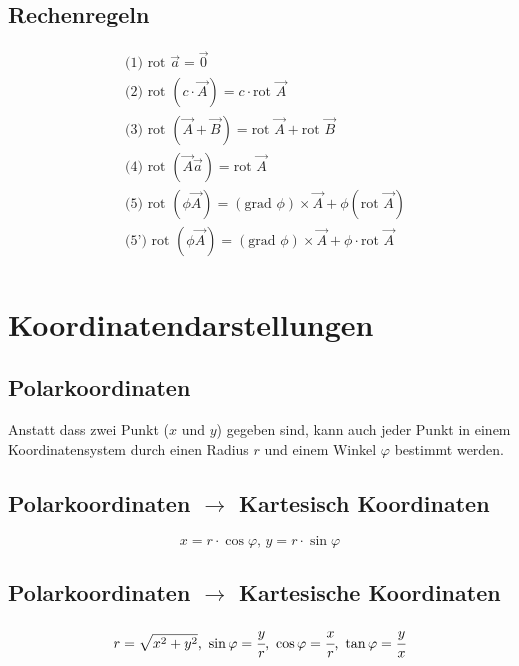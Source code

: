 \documentclass[a4paper,10pt]{scrartcl}
\begin{document}
        \subsection*{Rechenregeln}
        \begin{equation*}
            \begin{aligned}
                & \text{(1) rot }  \vec{a} = \vec{0} \\
                & \text{(2) rot }  (c \cdot \vec{A}) = c \cdot \text{rot } \vec{A} \\
                & \text{(3) rot }  (\vec{A} + \vec{B}) = \text{rot } \vec{A} + \text{rot } \vec{B} \\
                & \text{(4) rot }  (\vec{A} \vec{a}) = \text{rot } \vec{A} \\
                & \text{(5) rot }  (\phi \vec{A})= (\text{grad }  \phi) \times \vec{A} + \phi(\text{rot } \vec{A}) \\
                & \text{(5') rot }  (\phi \vec{A})= (\text{grad }  \phi) \times \vec{A} + \phi \cdot \text{rot } \vec{A} \\
            \end{aligned}
        \end{equation*}

    \section{Koordinatendarstellungen}
        \subsection{Polarkoordinaten}
        Anstatt dass zwei Punkt (\(x \text{ und } y\)) gegeben  sind, kann auch jeder Punkt in einem Koordinatensystem durch einen Radius \(r\) und 
        einem Winkel \(\varphi\) bestimmt werden.
        \subsection*{Polarkoordinaten \(\rightarrow\) Kartesisch Koordinaten}
            \begin{equation*}
                x = r \cdot \cos \varphi\text{, } y = r \cdot \sin \varphi  
            \end{equation*}
        \subsection*{Polarkoordinaten \(\rightarrow\) Kartesische Koordinaten}
            \begin{equation}
                r = \sqrt{x^2 + y^2} \text{, } \sin \varphi = \cfrac{y}{r} \text{, } \cos \varphi = \cfrac{x}{r} \text{, } \tan \varphi = \cfrac{y}{x} 
            \end{equation}
\end{document}

